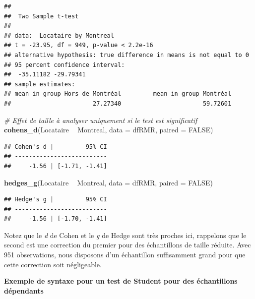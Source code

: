 \documentclass[
  11pt,
  french,
]{book}
\makeatletter
\newenvironment{Shaded}{\begin{snugshade}}{\end{snugshade}}
\newcommand{\CommentTok}[1]{\textcolor[rgb]{0.56,0.35,0.01}{\textit{#1}}}
\newcommand{\DataTypeTok}[1]{\textcolor[rgb]{0.13,0.29,0.53}{#1}}
\newcommand{\KeywordTok}[1]{\textcolor[rgb]{0.13,0.29,0.53}{\textbf{#1}}}
\newcommand{\NormalTok}[1]{#1}
\newcommand{\OperatorTok}[1]{\textcolor[rgb]{0.81,0.36,0.00}{\textbf{#1}}}
\newcommand{\OtherTok}[1]{\textcolor[rgb]{0.56,0.35,0.01}{#1}}
\newcommand{\StringTok}[1]{\textcolor[rgb]{0.31,0.60,0.02}{#1}}
\newenvironment{kframe}{%
\medskip{}
\setlength{\fboxsep}{.8em}
 \def\at@end@of@kframe{}%
 \ifinner\ifhmode%
  \def\at@end@of@kframe{\end{minipage}}%
  \begin{minipage}{\columnwidth}%
 \fi\fi%
 \def\FrameCommand##1{\hskip\@totalleftmargin \hskip-\fboxsep
 \colorbox{shadecolor}{##1}\hskip-\fboxsep
     \hskip-\linewidth \hskip-\@totalleftmargin \hskip\columnwidth}%
 \MakeFramed {\advance\hsize-\width
   \@totalleftmargin\z@ \linewidth\hsize
   \@setminipage}}%
 {\par\unskip\endMakeFramed%
 \at@end@of@kframe}
\renewenvironment{Shaded}{\begin{kframe}}{\end{kframe}}
\makeatother
\begin{document}
\begin{verbatim}
## 
## 	Two Sample t-test
## 
## data:  Locataire by Montreal
## t = -23.95, df = 949, p-value < 2.2e-16
## alternative hypothesis: true difference in means is not equal to 0
## 95 percent confidence interval:
##  -35.11182 -29.79341
## sample estimates:
## mean in group Hors de Montréal         mean in group Montréal 
##                       27.27340                       59.72601
\end{verbatim}

\begin{Shaded}
\begin{Highlighting}[]
\CommentTok{# Effet de taille à analyser uniquement si le test est significatif}
\KeywordTok{cohens_d}\NormalTok{(Locataire }\OperatorTok{~}\StringTok{ }\NormalTok{Montreal, }\DataTypeTok{data =}\NormalTok{ dfRMR, }\DataTypeTok{paired =} \OtherTok{FALSE}\NormalTok{)}
\end{Highlighting}
\end{Shaded}

\begin{verbatim}
## Cohen's d |         95% CI
## --------------------------
##     -1.56 | [-1.71, -1.41]
\end{verbatim}

\begin{Shaded}
\begin{Highlighting}[]
\KeywordTok{hedges_g}\NormalTok{(Locataire }\OperatorTok{~}\StringTok{ }\NormalTok{Montreal, }\DataTypeTok{data =}\NormalTok{ dfRMR, }\DataTypeTok{paired =} \OtherTok{FALSE}\NormalTok{)}
\end{Highlighting}
\end{Shaded}

\begin{verbatim}
## Hedge's g |         95% CI
## --------------------------
##     -1.56 | [-1.70, -1.41]
\end{verbatim}

Notez que le \emph{d} de Cohen et le \emph{g} de Hedge sont très proches ici, rappelons que le second est une correction du premier pour des échantillons de taille réduite. Avec 951 observations, nous disposons d'un échantillon suffisamment grand pour que cette correction soit négligeable.

\textbf{Exemple de syntaxe pour un test de Student pour des échantillons dépendants}
\end{document}
